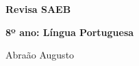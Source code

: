               \vspace*{\fill}
              \begin{center}
              {\HUGE\textbf{Revisa SAEB}}\bigskip

              {\LARGE\textbf{8º ano: Língua Portuguesa}}

              \bigskip
              \bigskip
              \bigskip

              {\Large
                            Abraão Augusto

                            }
              \end{center}
              \vspace*{\fill}

\endgroup
\pagebreak